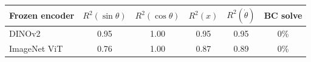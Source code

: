 \begin{tabular}{lccccc}
\toprule
Frozen encoder & $R^2(\sin\theta)$ & $R^2(\cos\theta)$ & $R^2(x)$ & $R^2(\dot\theta)$ & BC solve \\
\midrule
DINOv2 & 0.95 & 1.00 & 0.95 & 0.95 & 0\% \\
ImageNet ViT & 0.76 & 1.00 & 0.87 & 0.89 & 0\% \\
\bottomrule
\end{tabular}
